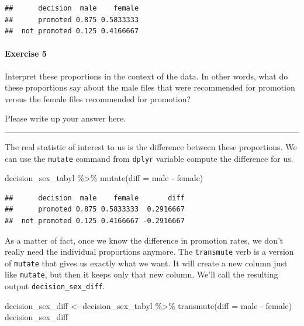 \documentclass[
]{book}
\newenvironment{Shaded}{\begin{snugshade}}{\end{snugshade}}
\newcommand{\AttributeTok}[1]{\textcolor[rgb]{0.77,0.63,0.00}{#1}}
\newcommand{\FunctionTok}[1]{\textcolor[rgb]{0.00,0.00,0.00}{#1}}
\newcommand{\NormalTok}[1]{#1}
\newcommand{\OtherTok}[1]{\textcolor[rgb]{0.56,0.35,0.01}{#1}}
\newcommand{\SpecialCharTok}[1]{\textcolor[rgb]{0.00,0.00,0.00}{#1}}
\begin{document}
\begin{verbatim}
##      decision  male    female
##      promoted 0.875 0.5833333
##  not promoted 0.125 0.4166667
\end{verbatim}

\hypertarget{exercise-5-5}{%
\paragraph*{Exercise 5}\label{exercise-5-5}}

Interpret these proportions in the context of the data. In other words, what do these proportions say about the male files that were recommended for promotion versus the female files recommended for promotion?

Please write up your answer here.

\begin{center}\rule{0.5\linewidth}{0.5pt}\end{center}

The real statistic of interest to us is the difference between these proportions. We can use the \texttt{mutate} command from \texttt{dplyr} variable compute the difference for us.

\begin{Shaded}
\begin{Highlighting}[]
\NormalTok{decision\_sex\_tabyl }\SpecialCharTok{\%\textgreater{}\%}
    \FunctionTok{mutate}\NormalTok{(}\AttributeTok{diff =}\NormalTok{ male }\SpecialCharTok{{-}}\NormalTok{ female)}
\end{Highlighting}
\end{Shaded}

\begin{verbatim}
##      decision  male    female       diff
##      promoted 0.875 0.5833333  0.2916667
##  not promoted 0.125 0.4166667 -0.2916667
\end{verbatim}

As a matter of fact, once we know the difference in promotion rates, we don't really need the individual proportions anymore. The \texttt{transmute} verb is a version of \texttt{mutate} that gives us exactly what we want. It will create a new column just like \texttt{mutate}, but then it keeps only that new column. We'll call the resulting output \texttt{decision\_sex\_diff}.

\begin{Shaded}
\begin{Highlighting}[]
\NormalTok{decision\_sex\_diff }\OtherTok{\textless{}{-}}\NormalTok{ decision\_sex\_tabyl }\SpecialCharTok{\%\textgreater{}\%}
    \FunctionTok{transmute}\NormalTok{(}\AttributeTok{diff =}\NormalTok{ male }\SpecialCharTok{{-}}\NormalTok{ female)}
\NormalTok{decision\_sex\_diff}
\end{Highlighting}
\end{Shaded}
\end{document}
